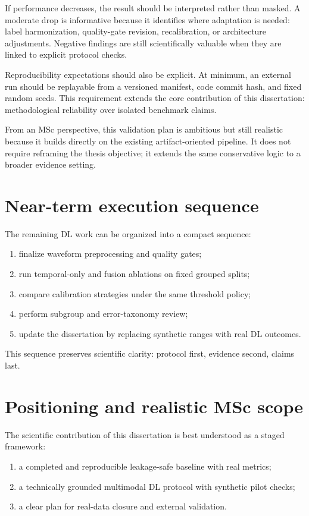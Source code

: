 If performance decreases, the result should be interpreted rather than masked. A moderate drop is informative because it identifies where adaptation is needed: label harmonization, quality-gate revision, recalibration, or architecture adjustments. Negative findings are still scientifically valuable when they are linked to explicit protocol checks.

Reproducibility expectations should also be explicit. At minimum, an external run should be replayable from a versioned manifest, code commit hash, and fixed random seeds. This requirement extends the core contribution of this dissertation: methodological reliability over isolated benchmark claims.

From an MSc perspective, this validation plan is ambitious but still realistic because it builds directly on the existing artifact-oriented pipeline. It does not require reframing the thesis objective; it extends the same conservative logic to a broader evidence setting.

\section{Near-term execution sequence}
The remaining DL work can be organized into a compact sequence:
\begin{enumerate}[leftmargin=1.2cm]
    \item finalize waveform preprocessing and quality gates;
    \item run temporal-only and fusion ablations on fixed grouped splits;
    \item compare calibration strategies under the same threshold policy;
    \item perform subgroup and error-taxonomy review;
    \item update the dissertation by replacing synthetic ranges with real DL outcomes.
\end{enumerate}

This sequence preserves scientific clarity: protocol first, evidence second, claims last.

\section{Positioning and realistic MSc scope}
The scientific contribution of this dissertation is best understood as a staged framework:
\begin{enumerate}[leftmargin=1.2cm]
    \item a completed and reproducible leakage-safe baseline with real metrics;
    \item a technically grounded multimodal DL protocol with synthetic pilot checks;
    \item a clear plan for real-data closure and external validation.
\end{enumerate}

